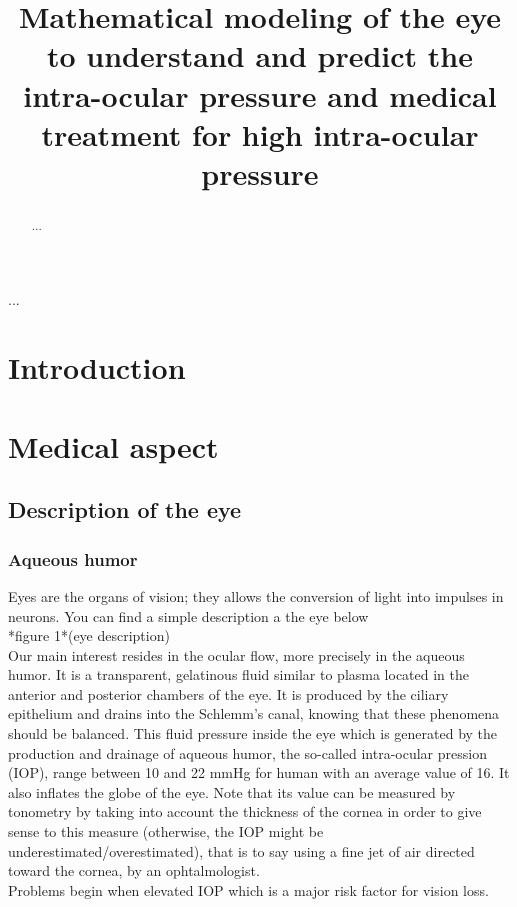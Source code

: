 \documentclass[english,12pt]{article}
\title{\bf Mathematical modeling of the eye to understand and predict the intra-ocular pressure and medical treatment for high intra-ocular pressure}
\date{}
\numberwithin{equation}{section}
\begin{document}
\maketitle



\begin{abstract}
\noindent 
...
\end{abstract}





\bigskip {}
...


\vskip25mm
\section{Introduction}\label{S1}







\section{Medical aspect}\label{s2}
\subsection{Description of the eye}
\subsubsection{Aqueous humor }
Eyes are the organs of vision; they allows the conversion of light into impulses in neurons. You can find a simple description a the eye below\\
%
*figure 1*(eye description)\\
Our main interest resides in the ocular flow, more precisely in the aqueous humor. It is a transparent, gelatinous fluid similar to plasma located in the anterior and posterior chambers of the eye. It is produced by the ciliary epithelium and drains into the Schlemm's canal, knowing that these phenomena should be balanced.
This fluid pressure inside the eye which is generated by the production and drainage of aqueous humor, the so-called intra-ocular pression (IOP), range between 10 and 22 mmHg for human with an average value of 16. It also inflates the globe of the eye.
Note that its value can be measured by tonometry by taking into account the thickness of the cornea in order to give sense to this measure (otherwise, the IOP might be underestimated/overestimated), that is to say using a fine jet of air directed toward the cornea, by an ophtalmologist.\\
Problems begin when elevated IOP which is a major risk factor for vision loss.
\end{document}
